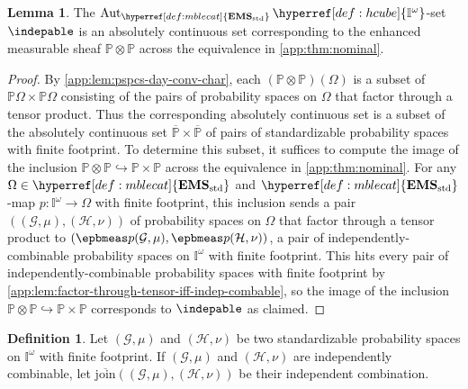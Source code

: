 \documentclass[
  sigconf,
  screen, ]{acmart}
\theoremstyle{definition}
\newtheorem{lemma}[theorem]{Lemma}
\newtheorem{definition}[theorem]{Definition}
\newcommand\Aut{\operatorname{Aut}}
\newcommand\calG{\mathcal G}
\newcommand\calH{\mathcal H}
\newcommand\nref[2]{\hyperref[#1]{#2}} \newcommand\checkhigh{{\huge{\color{red}\textbf{TODO: check}}}}
\newcommand\shotimes{\mathop{\otimes}}
\newcommand\texhcube{{{{\mathbb I}^\omega}}}
\newcommand\hcube{{\nref{def:hcube}{\texhcube}}}
\newcommand\texagoodname{absolutely continuous set}
\newcommand\agoodname{\texagoodname}
\newcommand\aagoodname{an \texagoodname}
\newcommand\sheafcatadj{enhanced measurable}
\newcommand\texgoodsheaf{\sheafcatadj{} sheaf}
\newcommand\goodsheaf{\texgoodsheaf}
\newcommand\texStdMble{\mathbf{EMS}_{\rm std}}
\newcommand\StdMble{{\nref{def:mblecat}{\texStdMble}}}
\newcommand\texpspcs{\mathbb P}
\newcommand\pspcs{{\nref{def:mble-pspcs}{\texpspcs}}}
\newcommand\gpcmjoin{{\nref{app:def:gpspcs-join}{\overline{\mathrm{join}}}}}
\newcommand\preauti{{{\Aut_\StdMble\hcube}}}
\newcommand\texgpspcs{\overline{\mathbb P}}
\newcommand\gpspcs{{\nref{def:gpspcs}{\texgpspcs}}}
\begin{document}
\begin{lemma} \label{app:lem:indepable-corresp}
  The $\preauti$-set $\indepable$ is \aagoodname{}
  corresponding to
  the \goodsheaf{} $\pspcs\shotimes\pspcs$
  across the equivalence in \cref{app:thm:nominal}.
\end{lemma}
\begin{proof}
  By \cref{app:lem:pspcs-day-conv-char},
  each $(\pspcs\shotimes\pspcs)(\Omega)$
  is a subset of $\pspcs\Omega\times\pspcs\Omega$
  consisting of the pairs of probability spaces on $\Omega$
  that factor through a tensor product.
  Thus the corresponding \agoodname{}
  is a subset of the \agoodname{}
  $\gpspcs\times\gpspcs$
  of pairs of standardizable probability spaces
  with finite footprint.
  To determine this subset, it suffices to compute
  the image of the inclusion $\pspcs\shotimes\pspcs\hookrightarrow\pspcs\times\pspcs$
  across the equivalence in \cref{app:thm:nominal}.
  For any $\Omega\in\StdMble$
  and $\StdMble$-map $p : \hcube\to\Omega$ with finite footprint,
  this inclusion sends a pair $((\calG,\mu),(\calH,\nu))$
  of probability spaces on $\Omega$ that factor through a tensor product
  to $(\epbmeas p{(\calG,\mu)},\epbmeas p{(\calH,\nu)})$,
  a pair of independently-combinable probability spaces on $\hcube$ with
  finite footprint.
  This hits every pair of independently-combinable probability spaces
  with finite footprint by
  \cref{app:lem:factor-through-tensor-iff-indep-combable},
  so the image of the inclusion $\pspcs\shotimes\pspcs\hookrightarrow\pspcs\times\pspcs$
  corresponds to $\indepable$ as claimed.
\end{proof}

\begin{definition} \label{app:def:gpspcs-join}
  Let $(\calG,\mu)$ and $(\calH,\nu)$
  be two standardizable probability spaces on $\hcube$
  with finite footprint.
  If $(\calG,\mu)$ and $(\calH,\nu)$
  are independently combinable,
  let $\gpcmjoin((\calG,\mu),(\calH,\nu))$
  be their independent combination.
\end{definition}
\end{document}
